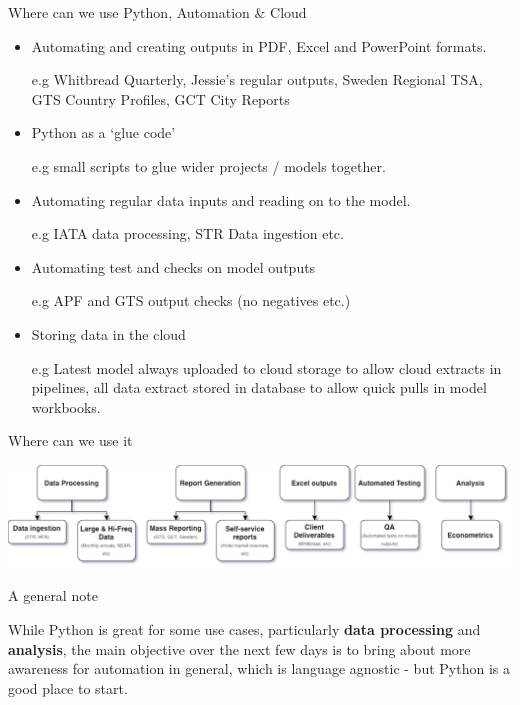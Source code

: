 \documentclass[aspectratio=169]{beamer}
\begin{document}
\begin{frame}{Where can we use Python, Automation \& Cloud}

\begin{itemize}
\item Automating and creating outputs in PDF, Excel and PowerPoint formats.

 		{\small e.g Whitbread Quarterly, Jessie's regular outputs, Sweden Regional TSA, GTS Country Profiles, GCT City Reports}
 		
\item Python as a `glue code'

	{\small e.g small scripts to glue wider projects / models together.}
 		
 \item {Automating regular data inputs and reading on to the model.} 
 
 		{\small e.g IATA data processing, STR Data ingestion etc.}
 		
 \item{Automating test and checks on model outputs}
 
	 {\small e.g APF and GTS output checks (no negatives etc.)}
	 
	 
 \item{Storing data in the cloud}
 
	 {\small e.g Latest model always uploaded to cloud storage to allow cloud extracts in pipelines, all data extract stored in database to allow quick pulls in model workbooks.}
 		
\end{itemize}
\end{frame}

\begin{frame}{Where can we use it}

\includegraphics[width=\linewidth]{graphics/projects.drawio.png}
	
\end{frame}


\begin{frame}{A general note}

{\Large While Python is great for some use cases, particularly \textbf{data processing} and \textbf{analysis}, the main objective over the next few days is to bring about more awareness for automation in general, which is language agnostic - but Python is a good place to start.}
	
\end{frame}
\end{document}
